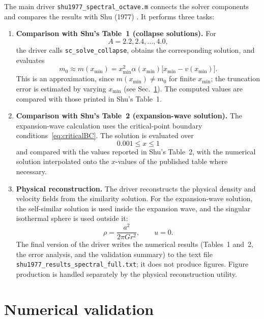 \documentclass[11pt,a4paper]{article}
\begin{document}
The main driver \texttt{shu1977\_spectral\_octave.m} connects the solver
components and compares the results with Shu (1977) \cite{shu1977}. It
performs three tasks:

\begin{enumerate}

\item \textbf{Comparison with Shu's Table~1 (collapse solutions).}
For
\[
A=2.2,2.4,\ldots,4.0,
\]
the driver calls \texttt{sc\_solve\_collapse}, obtains the corresponding
solution, and evaluates
\begin{equation}
m_0
\approx
m(x_{\min})
=
x_{\min}^{2}\alpha(x_{\min})
\bigl[x_{\min}-v(x_{\min})\bigr].
\label{eq:m0numerical}
\end{equation}
This is an approximation, since $m(x_{\min})\ne m_0$ for finite
$x_{\min}$; the truncation error is estimated by varying $x_{\min}$
(see Sec.~\ref{sec:validation}). The computed values are compared with
those printed in Shu's Table~1.

\item \textbf{Comparison with Shu's Table~2 (expansion-wave solution).}
The expansion-wave calculation uses the critical-point boundary
conditions~\eqref{eq:criticalBC}. The solution is evaluated over
\[
0.001\leq x\leq1
\]
and compared with the values reported in Shu's Table~2, with the
numerical solution interpolated onto the $x$-values of the published
table where necessary.

\item \textbf{Physical reconstruction.}
The driver reconstructs the physical density and velocity fields from
the similarity solution. For the expansion-wave solution, the
self-similar solution is used inside the expansion wave, and the
singular isothermal sphere is used outside it:
\begin{equation}
\rho=\frac{a^2}{2\pi G r^2},
\qquad
u=0.
\end{equation}
The final version of the driver writes the numerical results (Tables~1
and~2, the error analysis, and the validation summary) to the text file
\texttt{shu1977\_results\_spectral\_full.txt}; it does not produce
figures. Figure production is handled separately by the physical
reconstruction utility.

\end{enumerate}

\section{Numerical validation}\label{sec:validation}
\end{document}
